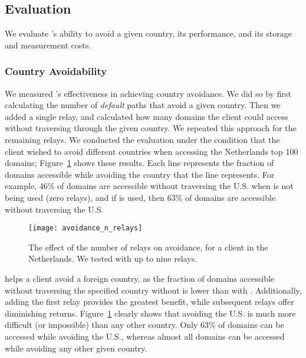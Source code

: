 \subsection{Evaluation}

We evaluate \system{}'s ability to avoid a given country, its performance,
and its storage and measurement costs.

\subsubsection{Country Avoidability}

We measured \system{}'s effectiveness in achieving country avoidance.  We did so by first 
calculating the number of {\it default} paths that avoid a given country.  Then 
we added a single relay, and calculated how many domains the client could 
access without traversing through the given country.  We repeated this approach for 
the remaining relays.  We conducted the evaluation under the condition that 
the client wished to avoid different countries when accessing the Netherlands top 
100 domains; Figure~\ref{fig:avoidance_eval} shows these results.  Each 
line represents the fraction of domains accessible while avoiding the country that 
the line represents.  For example, 46\% of domains are accessible without traversing 
the U.S. when \system{} is not being used (zero relays), and if \system{} is 
used, then 63\% of domains are accessible without traversing the U.S.

\begin{figure}[t]
\tiny
\centering
\texttt{[image: avoidance\_n\_relays]}
\caption{The effect of the number of relays on avoidance, for a client
  in the Netherlands. We tested \system{} with up to nine relays.}
\label{fig:avoidance_eval}
\end{figure}

\system{} helps a client avoid a foreign country,
as the fraction of domains accessible without traversing the specified
country without \system{} is lower than with \system{}.  Additionally,
adding the first relay provides the greatest benefit, while subsequent
relays offer diminishing returns.  Figure~\ref{fig:avoidance_eval}
clearly shows that avoiding the U.S. is much more difficult (or
impossible) than any other country.  Only 63\% of domains can be
accessed while avoiding the U.S., whereas almost all domains can be
accessed while avoiding any other given country.


